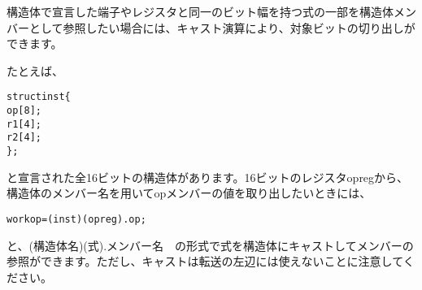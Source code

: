 構造体で宣言した端子やレジスタと同一のビット幅を持つ式の一部を構造体メンバーとして参照したい場合には、キャスト演算により、対象ビットの切り出しができます。

たとえば、

\begin{reviewemlist}
\begin{alltt}
struct inst \{
  op[8];
  r1[4];
  r2[4];
\} ;
\end{alltt}
\end{reviewemlist}

と宣言された全16ビットの構造体があります。16ビットのレジスタopregから、構造体のメンバー名を用いてopメンバーの値を取り出したいときには、

\begin{reviewemlist}
\begin{alltt}
   workop = (inst)(opreg).op;
\end{alltt}
\end{reviewemlist}

と、(構造体名)(式).メンバー名　の形式で式を構造体にキャストしてメンバーの参照ができます。ただし、キャストは転送の左辺には使えないことに注意してください。
